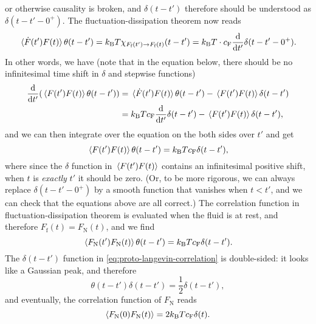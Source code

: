 \documentclass[hyperref, a4paper]{article}
\newcommand*{\kB}{k_{\text{B}}}
\newcommand{\cf}{c_{\text{F}}}
\newcommand{\fn}{F_{\text{N}}}
\newcommand{\ff}{F_{\text{f}}}
\begin{document}
or otherwise causality is broken,
and $\delta(t - t')$ therefore should be understood as 
$\delta(t - t' - 0^+)$.
The fluctuation-dissipation theorem now reads 
\begin{equation}
    \expval*{\dot{F}(t') F(t)} \theta(t - t') = \kB T \chi_{\ff(t') \to \ff(t)} (t - t')
    = \kB T \cdot \cf \dv{t'} \delta(t - t' - 0^+) .
\end{equation}
In other words, we have 
(note that in the equation below, 
there should be no infinitesimal time shift in $\delta$ and stepwise functions)
\begin{equation}
    \begin{aligned}
        \dv{t'} (
            \expval*{F(t') F(t)} \theta(t - t')
        ) &= \expval*{\dot{F}(t') F(t)} \theta(t - t')
        - \expval*{F(t') F(t)} \delta(t - t') \\
        &= \kB T \cf \dv{t'} \delta(t - t') 
        - \expval*{F(t') F(t)} \delta(t - t'),
    \end{aligned}
\end{equation}
and we can then integrate over the equation on the both sides over $t'$ and get 
\begin{equation}
    \expval*{F(t') F(t)} \theta(t - t') = \kB T \cf \delta(t - t'),
\end{equation}
where since the $\delta$ function in $\expval*{F(t') F(t)}$
contains an infinitesimal positive shift, 
when $t$ is \emph{exactly} $t'$ it should be zero.
(Or, to be more rigorous, we can always replace 
$\delta(t - t' - 0^+)$ by a smooth function that 
vanishes when $t < t'$, 
and we can check that the equations above are all correct.)
The correlation function in fluctuation-dissipation theorem 
is evaluated when the fluid is at rest,
and therefore $\ff(t) = \fn(t)$, and we find 
\begin{equation}
    \expval*{\fn(t') \fn(t)} \theta(t - t') = \kB T \cf \delta(t - t').
    \label{eq:proto-langevin-correlation}
\end{equation}
The $\delta(t - t')$ function in \eqref{eq:proto-langevin-correlation}
is double-sided: it looks like a Gaussian peak,
and therefore 
\begin{equation}
    \theta(t - t') \delta(t - t') = \frac{1}{2} \delta(t - t'),
\end{equation}
and eventually, the correlation function of $\fn$ reads 
\begin{equation}
    \expval{\fn(0) \fn(t)} = 2 \kB T \cf \delta(t).
\end{equation}
\end{document}
